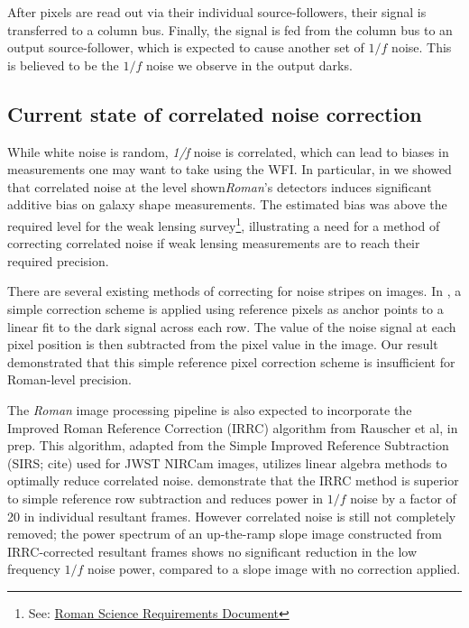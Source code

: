 \documentclass[12pt]{pasj01}
\begin{document}
After pixels are read out via their individual source-followers, their signal is transferred to a column bus. Finally, the signal is fed from the column bus to an output source-follower, which is expected to cause another set of $1/f$ noise. This is believed to be the $1/f$ noise we observe in the output darks.

\subsection{Current state of correlated noise correction}

While white noise is random, \textit{1/f} noise is correlated, which can lead to biases in measurements one may want to take using the WFI. In particular, in \cite{Laliotis2024} we showed that correlated noise at the level shown\textit{Roman}'s detectors induces significant additive bias on galaxy shape measurements. The estimated bias was above the required level for the weak lensing survey\footnote{See: \href{https://roman.gsfc.nasa.gov/science/docs/RST-SYS-REQ-0020D_DOORs_Export.pdf}{Roman Science Requirements Document}}, illustrating a need for a method of correcting correlated noise if weak lensing measurements are to reach their required precision.

There are several existing methods of correcting for noise stripes on images. In \cite{Laliotis2024}, a simple correction scheme is applied using reference pixels as anchor points to a linear fit to the dark signal across each row. The value of the noise signal at each pixel position is then subtracted from the pixel value in the image. Our result demonstrated that this simple reference pixel correction scheme is insufficient for Roman-level precision.

The \textit{Roman} image processing pipeline is also expected to incorporate the Improved Roman Reference Correction (IRRC) algorithm from Rauscher et al, in prep. This algorithm, adapted from the Simple Improved Reference Subtraction (SIRS; cite) used for JWST NIRCam images, utilizes linear algebra methods to optimally reduce correlated noise. \cite{Betti2024} demonstrate that the IRRC method is superior to simple reference row subtraction and reduces power in $1/f$ noise by a factor of 20 in individual resultant frames. However correlated noise is still not completely removed; the power spectrum of an up-the-ramp slope image constructed from IRRC-corrected resultant frames shows no significant reduction in the low frequency $1/f$ noise power, compared to a slope image with no correction applied.
\end{document}
